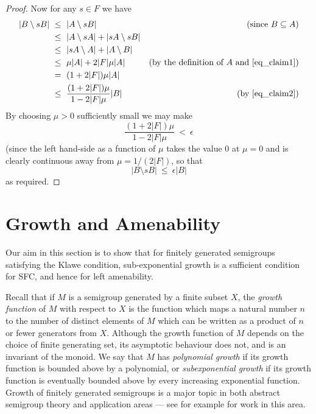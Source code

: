 \documentclass[11pt,a4paper,reqno]{amsart}
\begin{document}
\begin{proof}
Now for any $s \in F$ we have
\begin{align*}
|B \setminus sB| \ &\leq \ |A \setminus sB| &\textrm{(since $B \subseteq A$)} \\
&\leq \ |A \setminus sA| + |sA \setminus sB| \\
&\leq \ |sA \setminus A| + |A \setminus B| \\
&\leq \ \mu |A| + 2 |F| \mu |A| & (\textrm{by the definition of $A$ and } \eqref{eq_claim1})\\
&= \ (1 + 2|F|) \mu |A| \\
&\leq \ \frac{(1 + 2|F|) \mu}{1-2|F| \mu} |B| &(\textrm{by } \eqref{eq_claim2})
\end{align*}
By choosing $\mu > 0$ sufficiently small we may make
$$\frac{(1+2|F|) \mu}{1-2|F| \mu} \ < \ \epsilon$$
(since the left hand-side as a function of $\mu$ takes the value $0$ at
$\mu = 0$ and is clearly continuous away from $\mu = 1/(2|F|)$, so that
$$|B \setminus sB| \ \leq \ \epsilon |B|$$
as required.
\end{proof}

\section{Growth and Amenability}

Our aim in this section is to show that for finitely generated semigroups
satisfying the Klawe condition, sub-exponential growth is a sufficient
condition for SFC, and hence for left amenability.

Recall that if $M$ is a semigroup generated by a finite subset $X$, the
\textit{growth function} of $M$ with respect to $X$ is the function which
maps a natural number $n$ to the number of distinct elements of $M$ which can
be written as a product of $n$ or fewer generators from $X$. Although the
growth function of $M$ depends on the choice of finite generating set, its
asymptotic behaviour does not, and is an invariant of the monoid. We say
that $M$ has \textit{polynomial growth} if its growth function is bounded
above by a polynomial, or \textit{subexponential growth} if its growth
function is eventually bounded above by every increasing exponential function.
Growth of finitely generated semigroups is a major topic in both abstract semigroup
theory and application areas --- see for example \cite{Cedo07,Grigorchuk88,Shneerson08}
for work in this area.
\end{document}

